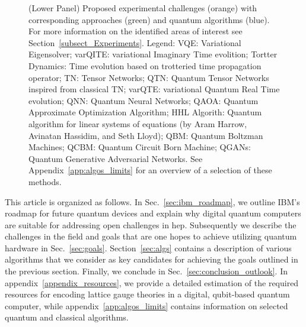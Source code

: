 \begin{figure}[htp!]
{    (Lower Panel) 
    Proposed experimental challenges (orange) with corresponding approaches (green) and quantum algorithms (blue). For more information on the identified areas of interest see Section~\ref{subsect_Experiments}. 
    Legend: 
    VQE: Variational Eigensolver; 
    varQITE: variational Imaginary Time evolition;
    Tortter Dynamics: Time evolution based on trotteried time propagation operator;
    TN: Tensor Networks;
    QTN: Quantum Tensor Networks inspired from classical TN; 
    varQTE: variational Quantum Real Time evolution;
    QNN: Quantum Neural Networks;
    QAOA: Quantum Approximate Optimization Algorithm; 
    HHL Algorith:  Quantum algorithm for linear systems of equations (by Aram Harrow, Avinatan Hassidim, and Seth Lloyd);
    QBM: Quantum Boltzman Machines;
    QCBM: Quantum Circuit Born Machine; 
    QGANs: Quantum Generative Adversarial Networks.
    See Appendix~\ref{app:algos_limits} for an overview of a selection of these methods.}
    \label{fig:qiskit-merged}
\end{figure}


This article is organized as follows. In Sec.~\ref{sec:ibm_roadmap}, we outline IBM's roadmap for future quantum devices and explain why digital quantum computers are suitable for addressing open challenges in \gls{hep}. Subsequently we describe the challenges in the field and goals that are one hopes to achieve utilizing quantum hardware in Sec.~\ref{sec:goals}. Section~\ref{sec:algs} contains a description of various algorithms that we consider as key candidates for achieving the goals outlined in the previous section. Finally, we conclude in Sec.~\ref{sec:conclusion_outlook}. In appendix~\ref{appendix_resources}, we provide a detailed estimation of the required resources for encoding lattice gauge theories in a digital, qubit-based quantum computer, while appendix~\ref{app:algos_limits} contains information on selected quantum and classical algorithms.
